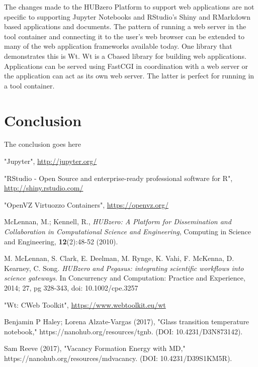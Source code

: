 \documentclass[conference]{../sty/IEEEtran}
\newcommand\CC{C\nolinebreak[4]\hspace{-.05em}\raisebox{.4ex}{\relsize{-3}{\textbf{++}}}\hspace{.25em}}
\begin{document}
The changes made to the HUBzero Platform to support web applications are not
specific to supporting Jupyter Notebooks and RStudio's Shiny and RMarkdown
based applications and documents. The pattern of running a web server in the
tool container and connecting it to the user's web browser can be extended to
many of the web application frameworks available today. One library that
demonstrates this is Wt\cite{wt}. Wt is a \CC based library for building web
applications. Applications can be served using FastCGI in coordination with a
web server or the application can act as its own web server. The latter is
perfect for running in a tool container.




\section{Conclusion}
The conclusion goes here




\begin{thebibliography}{1}

"Jupyter", \url{http://jupyter.org/}

"RStudio - Open Source and enterprise-ready professional software for R", \url{http://shiny.rstudio.com/}

"OpenVZ Virtuozzo Containers", \url{https://openvz.org/}

McLennan, M.; Kennell, R., \emph{HUBzero: A Platform for Dissemination
and Collaboration in Computational Science and Engineering}, Computing
in Science and Engineering, \textbf{12}(2):48-52 (2010).

M. McLennan, S. Clark, E. Deelman, M. Rynge, K. Vahi, F.
McKenna, D. Kearney, C. Song. \emph{HUBzero and Pegasus:
integrating scientific workflows into science gateways.} In
Concurrency and Computation: Practice and Experience,
2014; 27, pg 328-343, doi: 10.1002/cpe.3257

"Wt: \CC Web Toolkit", \url{https://www.webtoolkit.eu/wt}

Benjamin P Haley; Lorena Alzate-Vargas (2017), "Glass transition temperature notebook," https://nanohub.org/resources/tgnb. (DOI: 10.4231/D3N873142).

Sam Reeve (2017), "Vacancy Formation Energy with MD," https://nanohub.org/resources/mdvacancy. (DOI: 10.4231/D39S1KM5R).

\end{thebibliography}
\end{document}
